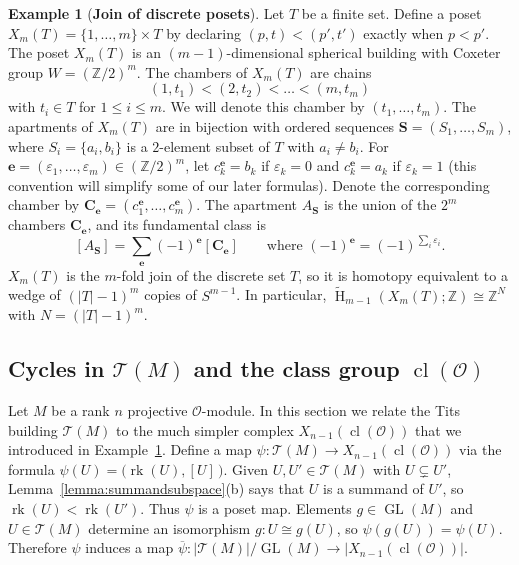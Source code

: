 \documentclass[11 pt]{article}
\theoremstyle{plain}
\theoremstyle{definition}
\newtheorem{example}[theorem]{Example}
\numberwithin{equation}{section}
\DeclareMathOperator{\GL}{GL}
\newcommand\Z{\ensuremath{\mathbb{Z}}}
\DeclareMathOperator{\HH}{H}
\renewcommand{\epsilon}{\varepsilon}
\renewcommand{\O}{\mathcal{O}}
\DeclareMathOperator{\class}{cl}
\newcommand{\cl}{\class}
\newcommand\Tits{\ensuremath{\mathcal{T}}}
\newcommand\T{\Tits}
\newcommand\bS{\mathbf{S}}
\newcommand\e{\mathbf{e}}
\newcommand\CC{\mathbf{C}}
\newcommand\abs[1]{\left\lvert#1\right\rvert}
\DeclareMathOperator{\Rank}{rk}
\newcommand\iso{\cong}
\begin{document}
\begin{example}[{\bf Join of discrete posets}]
\label{ex:joindiscrete}
Let $T$ be a finite set.  Define a poset $X_m(T) = \{1,\ldots,m\} \times T$ by declaring $(p,t) < (p',t')$ exactly when
$p < p'$.  The poset $X_m(T)$ is an $(m-1)$-dimensional spherical building with Coxeter group
$W = (\Z/2)^{m}$.  The chambers of $X_m(T)$ are chains
\[(1,t_1) < (2,t_2) < \ldots < (m,t_{m})\]
with $t_i \in T$ for $1 \leq i \leq m$.  We will denote this chamber by
$(t_1,\ldots,t_m)$.
The apartments of $X_m(T)$ are in bijection with ordered sequences
$\bS = (S_1,\ldots,S_{m})$, where $S_i = \{a_i,b_i\}$ is a 
$2$-element subset of $T$ with $a_i \neq b_i$.
For $\e=(\epsilon_1,\ldots,\epsilon_{m})\in (\Z/2)^{m}$,
let $c^\e_k=b_k$ if $\epsilon_k=0$ and $c^\e_k=a_k$ if $\epsilon_k=1$ (this
 convention will simplify some of our later formulas).  Denote the
corresponding chamber by $\CC_\e=(c^\e_1,\ldots,c^\e_{m})$.  The apartment
$A_{\bS}$ is the union of the $2^{m}$ chambers $\CC_\e$, and its fundamental
class is
\[[A_{\bS}]=\sum_\e (-1)^{\e} [\CC_\e] \quad \quad \text{where $(-1)^{\e} = (-1)^{\sum_i \epsilon_i}$}.\]
$X_m(T)$ is the $m$-fold join of the discrete set $T$, so
it is homotopy equivalent to a wedge of $(\abs{T}-1)^{m}$ copies of $S^{m-1}$. In particular, $\widetilde{\HH}_{m-1}(X_m(T);\Z)\iso \Z^N$ with $N={(\abs{T}-1)^m}$.
\end{example}

\subsection{Cycles in \texorpdfstring{$\Tits(M)$}{T(M)} and the class group \texorpdfstring{$\cl(\O)$}{clO} }
\label{section:structureTitsM}

Let $M$ be a rank $n$ projective $\O$-module.  In this section we relate the Tits building $\T(M)$ to the
much simpler complex $X_{n-1}(\cl(\O))$ that we introduced in Example~\ref{ex:joindiscrete}.  Define a map
$\psi\colon \T(M) \rightarrow X_{n-1}(\cl(\O))$ via the formula
$\psi(U)=\big(\Rank(U),[U]\,\big)$.
Given $U,U' \in \Tits(M)$ with $U\subsetneq U'$, Lemma~\ref{lemma:summandsubspace}(b) says that $U$ is a summand of $U'$,
so $\Rank(U)<\Rank(U')$.  Thus $\psi$ is a poset map.
Elements $g \in \GL(M)$ and $U \in \Tits(M)$ determine an isomorphism $g\colon U\iso g(U)$, so $\psi(g(U)) = \psi(U)$. Therefore $\psi$ induces
a map $\overline{\psi}\colon \abs{\Tits(M)} / \GL(M) \rightarrow \abs{X_{n-1}(\class(\O))}$.
\end{document}

